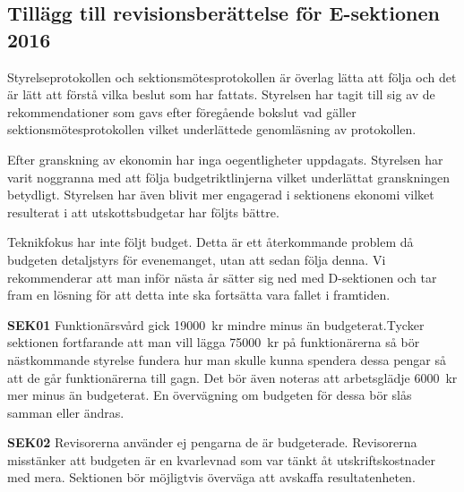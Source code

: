 \documentclass[../_main/handlingar.tex]{subfiles}
\begin{document}
\subsection{Tillägg till revisionsberättelse för E-sektionen 2016}

Styrelseprotokollen och sektionsmötesprotokollen är överlag lätta att följa och det är lätt att förstå vilka beslut som har fattats. Styrelsen har tagit till sig av de rekommendationer som gavs efter föregående bokslut vad gäller sektionsmötesprotokollen vilket underlättede genomläsning av protokollen.

Efter granskning av ekonomin har inga oegentligheter uppdagats. Styrelsen har varit noggranna med att följa budgetriktlinjerna vilket underlättat granskningen betydligt. Styrelsen har även blivit mer engagerad i sektionens ekonomi vilket resulterat i att utskottsbudgetar har följts bättre.

Teknikfokus har inte följt budget. Detta är ett återkommande problem då budgeten detaljstyrs för evenemanget, utan att sedan följa denna. Vi rekommenderar att man inför nästa år sätter sig ned med D-sektionen och tar fram en lösning för att detta inte ska fortsätta vara fallet i framtiden.

\textbf{SEK01} Funktionärsvård gick \SI{19000}{kr} mindre minus än budgeterat.Tycker sektionen
fortfarande att man vill lägga \SI{75000}{kr} på funktionärerna så bör nästkommande styrelse fundera hur man skulle kunna spendera dessa pengar så att de går funktionärerna till gagn. Det bör även noteras att arbetsglädje \SI{6000}{kr} mer minus än budgeterat. En övervägning om budgeten för dessa bör slås samman eller ändras.

\textbf{SEK02} Revisorerna använder ej pengarna de är budgeterade. Revisorerna misstänker att budgeten är en kvarlevnad som var tänkt åt utskriftskostnader med mera. Sektionen bör möjligtvis överväga att avskaffa resultatenheten.
\end{document}
